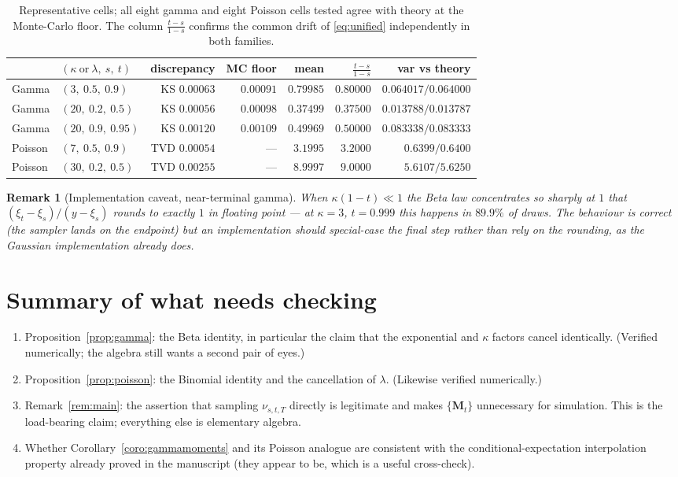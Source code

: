 \documentclass[11pt,a4paper]{article}
\newtheorem{rem}[prop]{Remark}
\def\Mb{\mathbf{M}}
\begin{document}
\begin{table}[h]
\centering
\small
\begin{tabular}{llrrrrr}
\toprule
& $(\kappa\ \text{or}\ \lambda,\ s,\ t)$ & discrepancy & MC floor & mean & $\frac{t-s}{1-s}$ & var vs theory \\
\midrule
Gamma & $(3,\ 0.5,\ 0.9)$   & KS $0.00063$ & $0.00091$ & $0.79985$ & $0.80000$ & $0.064017 / 0.064000$ \\
Gamma & $(20,\ 0.2,\ 0.5)$  & KS $0.00056$ & $0.00098$ & $0.37499$ & $0.37500$ & $0.013788 / 0.013787$ \\
Gamma & $(20,\ 0.9,\ 0.95)$ & KS $0.00120$ & $0.00109$ & $0.49969$ & $0.50000$ & $0.083338 / 0.083333$ \\
Poisson & $(7,\ 0.5,\ 0.9)$ & TVD $0.00054$ & --- & $3.1995$ & $3.2000$ & $0.6399 / 0.6400$ \\
Poisson & $(30,\ 0.2,\ 0.5)$& TVD $0.00255$ & --- & $8.9997$ & $9.0000$ & $5.6107 / 5.6250$ \\
\bottomrule
\end{tabular}
\caption{Representative cells; all eight gamma and eight Poisson cells tested agree
with theory at the Monte-Carlo floor. The column $\frac{t-s}{1-s}$ confirms the
common drift of \eqref{eq:unified} independently in both families.}
\end{table}

\begin{rem}[Implementation caveat, near-terminal gamma]
When $\kappa(1-t)\ll1$ the Beta law concentrates so sharply at $1$ that
$(\xi_t-\xi_s)/(y-\xi_s)$ rounds to exactly $1$ in floating point --- at $\kappa=3$,
$t=0.999$ this happens in $89.9\%$ of draws. The behaviour is correct (the sampler
lands on the endpoint) but an implementation should special-case the final step
rather than rely on the rounding, as the Gaussian implementation already does.
\end{rem}

\section{Summary of what needs checking}

\begin{enumerate}
\item Proposition~\ref{prop:gamma}: the Beta identity, in particular the claim that
the exponential and $\kappa$ factors cancel identically. (Verified numerically; the
algebra still wants a second pair of eyes.)
\item Proposition~\ref{prop:poisson}: the Binomial identity and the cancellation of
$\lambda$. (Likewise verified numerically.)
\item Remark~\ref{rem:main}: the assertion that sampling $\nu_{s,t,T}$ directly is
legitimate and makes $\{\Mb_t\}$ unnecessary for simulation. This is the load-bearing
claim; everything else is elementary algebra.
\item Whether Corollary~\ref{coro:gammamoments} and its Poisson analogue are
consistent with the conditional-expectation interpolation property already proved in
the manuscript (they appear to be, which is a useful cross-check).
\end{enumerate}
\end{document}
